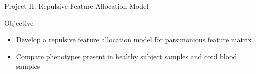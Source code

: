 \documentclass[ignorenonframetext,]{beamer}
\begin{document}
\begin{frame}{Project II: Repulsive Feature Allocation Model}
  \begin{block}{Objective}
  \begin{itemize}
    \setlength\itemsep{1em}
    \item Develop a repulsive feature allocation model for parsimonious feature
      matrix
    \item Compare phenotypes present in healthy subject samples and cord blood samples
  \end{itemize}
\end{block}
\end{frame}
\end{document}
